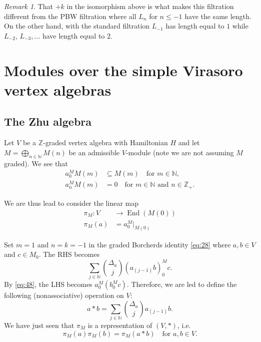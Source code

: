 \documentclass[a4paper, 12pt, reqno]{amsart}
\theoremstyle{remark}
\newtheorem{remark}[theorem]{Remark}
\numberwithin{equation}{subsection}
\DeclareMathOperator{\End}{End}
\begin{document}
\begin{remark}
  \label{rmk:29}
  That $+k$ in the isomorphism above is what makes this filtration different from the PBW filtration where all $L_n$ for $n \le -1$ have the same length.
  On the other hand, with the standard filtration $L_{-1}$ has length equal to $1$ while $L_{-2}$, $L_{-3}, \dots$ have length equal to $2$.
\end{remark}

\section{Modules over the simple Virasoro vertex algebras}
\label{sec:zhu-algebra}

\subsection{The Zhu algebra}
\label{sec:zhu-algebra-1}

Let $V$ be a $\mathbb{Z}$-graded vertex algebra with Hamiltonian $H$ and let $M = \bigoplus_{n \in \mathbb{N}} M(n)$ be an admissible $V$-module (note we are not assuming $M$ graded).
We see that
\begin{equation}
  \label{eq:48}
  \begin{split}
    a^M_{0}M(m) &\subseteq M(m) \quad \text{for } m \in \mathbb{N}, \\
    a^M_{n}M(m) &= 0 \quad \text{for }m \in \mathbb{N}\text{ and }n \in \mathbb{Z}_+.
  \end{split}
\end{equation}

We are thus lead to consider the linear map
\begin{align*}
  \pi_M: V &\to \End(M(0)) \\
  \pi_M(a) &= a^M_{0}|_{M(0)}
\end{align*}

Set $m = 1$ and $n = k = -1$ in the graded Borcherds identity \eqref{eq:28} where $a, b \in V$ and $c \in M_0$.
The RHS becomes
\begin{equation*}
  \sum_{j \in \mathbb{N}}\binom{\Delta_a}{j}(a_{(j - 1)}b)^M_0c.
\end{equation*}
By \eqref{eq:48}, the LHS becomes $a^M_0(b^M_0c)$.
Therefore, we are led to define the following (nonassociative) operation on $V$:
\begin{equation*}
  a*b = \sum_{j \in \mathbb{N}}\binom{\Delta_a}{j}a_{(j - 1)}b.
\end{equation*}
We have just seen that $\pi_M$ is a representation of $(V, *)$, i.e.\
\begin{equation}
  \label{eq:49}
  \pi_M(a)\pi_M(b) = \pi_M(a*b) \quad \text{for }a, b \in V.
\end{equation}
\end{document}
